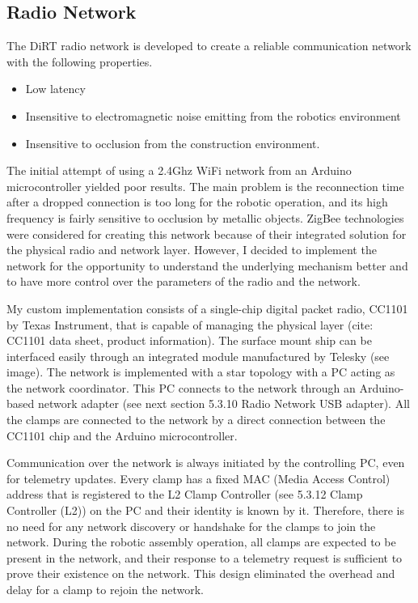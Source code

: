 \begin{itemize}
\subsection{Radio Network}
The DiRT radio network is developed to create a reliable communication network with the following properties.
\begin{itemize}
\item Low latency
\item Insensitive to electromagnetic noise emitting from the robotics environment
\item Insensitive to occlusion from the construction environment. 
\end{itemize}

The initial attempt of using a 2.4Ghz WiFi network from an Arduino microcontroller yielded poor results. The main problem is the reconnection time after a dropped connection is too long for the robotic operation, and its high frequency is fairly sensitive to occlusion by metallic objects. ZigBee technologies were considered for creating this network because of their integrated solution for the physical radio and network layer. However, I decided to implement the network for the opportunity to understand the underlying mechanism better and to have more control over the parameters of the radio and the network.


My custom implementation consists of a single-chip digital packet radio, CC1101 by Texas Instrument, that is capable of managing the physical layer (cite: CC1101 data sheet, product information). The surface mount ship can be interfaced easily through an integrated module manufactured by Telesky (see image). The network is implemented with a star topology with a PC acting as the network coordinator. This PC connects to the network through an Arduino-based network adapter (see next section 5.3.10 Radio Network USB adapter). All the clamps are connected to the network by a direct connection between the CC1101 chip and the Arduino microcontroller. 

Communication over the network is always initiated by the controlling PC, even for telemetry updates. Every clamp has a fixed MAC (Media Access Control) address that is registered to the L2 Clamp Controller (see 5.3.12 Clamp Controller (L2)) on the PC and their identity is known by it. Therefore, there is no need for any network discovery or handshake for the clamps to join the network. During the robotic assembly operation, all clamps are expected to be present in the network, and their response to a telemetry request is sufficient to prove their existence on the network. This design eliminated the overhead and delay for a clamp to rejoin the network.


\end{itemize}
